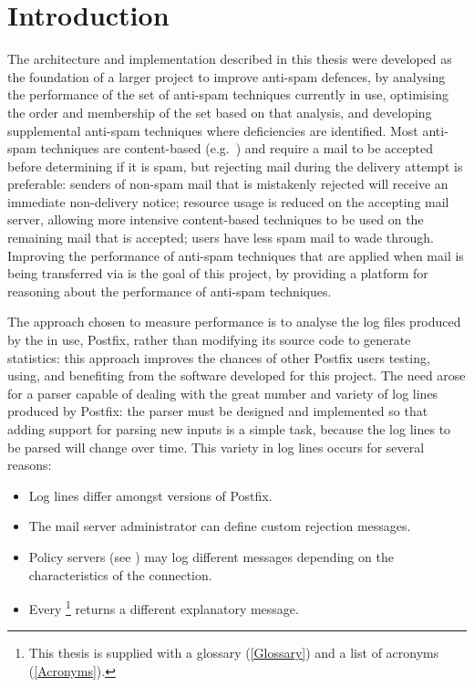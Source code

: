 \chapter{Introduction}

\label{introduction}

The architecture and implementation described in this thesis were developed
as the foundation of a larger project to improve anti-spam defences, by
analysing the performance of the set of anti-spam techniques currently in
use, optimising the order and membership of the set based on that analysis,
and developing supplemental anti-spam techniques where deficiencies are
identified.  Most anti-spam techniques are content-based
(e.g.~\cite{a-plan-for-spam, relaxed-online-svms, word-stemming}) and
require a mail to be accepted before determining if it is spam, but
rejecting mail during the delivery attempt is preferable: senders of
non-spam mail that is mistakenly rejected will receive an immediate
non-delivery notice; resource usage is reduced on the accepting mail
server, allowing more intensive content-based techniques to be used on the
remaining mail that is accepted; users have less spam mail to wade through.
Improving the performance of anti-spam techniques that are applied when
mail is being transferred via  is the goal of this project,
by providing a platform for reasoning about the performance of anti-spam
techniques.

The approach chosen to measure performance is to analyse the log files
produced by the  in use, Postfix, rather than modifying its
source code to generate statistics: this approach improves the chances of
other Postfix users testing, using, and benefiting from the software
developed for this project.  The need arose for a parser capable of dealing
with the great number and variety of log lines produced by Postfix: the
parser must be designed and implemented so that adding support for parsing
new inputs is a simple task, because the log lines to be parsed will change
over time.  This variety in log lines occurs for several reasons:

\begin{itemize}

    \squeezeitems{}

    \item Log lines differ amongst versions of Postfix.

    \item The mail server administrator can define custom rejection
        messages.

    \item Policy servers (see ) may log
        different messages depending on the characteristics of the
        connection.

    \item Every \footnote{This thesis is supplied with a
        glossary (\textsection\ref{Glossary}) and a list of acronyms
        (\textsection\ref{Acronyms}).} returns a different explanatory
        message.

\end{itemize}

